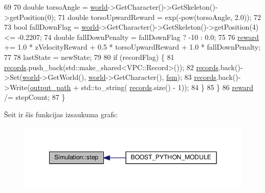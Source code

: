 \begin{DoxyCode}
69 
70         \textcolor{keywordtype}{double} torsoAngle = \hyperlink{class_simulation_ab8b3d4d3e13a05086f8497e5235fb37a}{world}->GetCharacter()->GetSkeleton()->getPosition(0);
71         \textcolor{keywordtype}{double} torsoUpwardReward = exp(-pow(torsoAngle, 2.0));
72 
73         \textcolor{keywordtype}{bool} fallDownFlag = \hyperlink{class_simulation_ab8b3d4d3e13a05086f8497e5235fb37a}{world}->GetCharacter()->GetSkeleton()->getPosition(4) <= -0.2207;
74         \textcolor{keywordtype}{double} fallDownPenalty = fallDownFlag ? -10 : 0.0;
75 
76         \hyperlink{class_simulation_a5224aea8e98ffc054c58674ab1494971}{reward} += 1.0 * zVelocityReward + 0.5 * torsoUpwardReward + 1.0 * fallDownPenalty;
77 
78         lastState = newState;
79 
80         \textcolor{keywordflow}{if} (recordFlag) \{
81             \hyperlink{class_simulation_a8e55698283d8bbba9843391b0d9ecfa8}{records}.push\_back(std::make\_shared<VPC::Record>());
82             \hyperlink{class_simulation_a8e55698283d8bbba9843391b0d9ecfa8}{records}.back()->Set(\hyperlink{class_simulation_ab8b3d4d3e13a05086f8497e5235fb37a}{world}->GetWorld(), \hyperlink{class_simulation_ab8b3d4d3e13a05086f8497e5235fb37a}{world}->GetCharacter(),
      \hyperlink{class_simulation_a3a7d01e2a53a88044001a28aab387a97}{fsm});
83             \hyperlink{class_simulation_a8e55698283d8bbba9843391b0d9ecfa8}{records}.back()->Write(\hyperlink{class_simulation_a7c51cfbcfc8f08e47535a504dfbdd18a}{output\_path} + std::to\_string(
      \hyperlink{class_simulation_a8e55698283d8bbba9843391b0d9ecfa8}{records}.size() - 1));
84         \}
85     \}
86     \hyperlink{class_simulation_a5224aea8e98ffc054c58674ab1494971}{reward} /= stepCount;
87 \}
\end{DoxyCode}


Šeit ir šīs funkcijas izsaukuma grafs\+:
\nopagebreak
\begin{figure}[H]
\begin{center}
\leavevmode
\includegraphics[width=349pt]{class_simulation_ae057193c8d120c47e136cdb9aeee2fd8_icgraph}
\end{center}
\end{figure}




